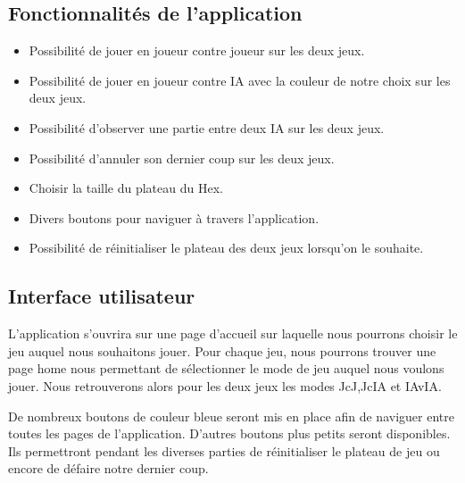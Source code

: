 \subsection*{Fonctionnalités de l'application}
\begin{itemize}
    \item Possibilité de jouer en joueur contre joueur sur les deux jeux.
    \item Possibilité de jouer en joueur contre IA avec la couleur de notre choix sur les deux jeux.
    \item Possibilité d'observer une partie entre deux IA sur les deux jeux.
    \item Possibilité d'annuler son dernier coup sur les deux jeux.
    \item Choisir la taille du plateau du Hex. 
    \item Divers boutons pour naviguer à travers l'application.
    \item Possibilité de réinitialiser le plateau des deux jeux lorsqu'on le souhaite.
\end{itemize}

\subsection*{Interface utilisateur}
L'application s'ouvrira sur une page d'accueil sur laquelle nous pourrons choisir le jeu auquel nous souhaitons jouer.
Pour chaque jeu, nous pourrons trouver une page home nous permettant de sélectionner le mode de jeu auquel nous voulons
jouer. Nous retrouverons alors pour les deux jeux les modes JcJ,JcIA et IAvIA.\@

De nombreux boutons de couleur bleue seront mis en place afin de naviguer entre toutes les pages de l'application. D'autres
boutons plus petits seront disponibles. Ils permettront pendant les diverses parties de réinitialiser le plateau de jeu ou encore de défaire 
notre dernier coup.


